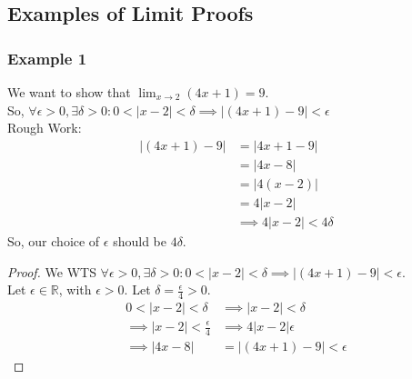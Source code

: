 \documentclass{article}
\begin{document}
\subsection{Examples of Limit Proofs}
\subsubsection{Example 1}
We want to show that $\lim_{x \to 2}(4x + 1) = 9$.\\
So, $\forall \epsilon > 0, \exists \delta > 0: 0 < | x - 2 | < \delta \implies | (4x+1) - 9| < \epsilon$\\
Rough Work:
\begin{align*}
    | (4x + 1) - 9 | & = | 4x + 1 - 9 |\\
    & = | 4x - 8 |\\
    & = | 4(x - 2) |\\
    & = 4 | x - 2 |\\
    & \implies 4 | x - 2 | < 4\delta
\end{align*}
So, our choice of $\epsilon$ should be $4\delta$.\\
\begin{proof}
    We WTS $\forall \epsilon > 0, \exists \delta > 0 : 0 < | x - 2 | < \delta \implies | (4x + 1) - 9 | < \epsilon$.\\
    Let $\epsilon \in \mathbb{R}$, with $\epsilon > 0$. Let $\delta = \frac{\epsilon}{4} > 0$.
    \begin{align*}
        0 < | x - 2 | < \delta & \implies | x - 2 | < \delta\\
        \implies | x -2 | < \frac{\epsilon}{4} & \implies 4 | x - 2 | \epsilon\\
        \implies | 4x - 8 | & = | (4x + 1) - 9 | < \epsilon
    \end{align*}
\end{proof}\\
\\
\end{document}
